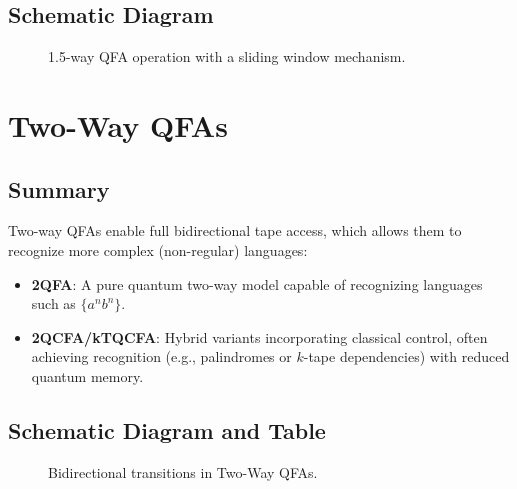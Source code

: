 \subsection{Schematic Diagram}
\begin{figure}[ht]
\centering
{}
\caption{1.5-way QFA operation with a sliding window mechanism.}
\label{fig:1.5qfa}
\end{figure}

\section{Two-Way QFAs}

\subsection{Summary}
Two-way QFAs enable full bidirectional tape access, which allows them to recognize more complex (non-regular) languages:
\begin{itemize}
    \item \textbf{2QFA}: A pure quantum two-way model capable of recognizing languages such as $\{a^nb^n\}$.
    \item \textbf{2QCFA/kTQCFA}: Hybrid variants incorporating classical control, often achieving recognition (e.g., palindromes or $k$-tape dependencies) with reduced quantum memory.
\end{itemize}

\subsection{Schematic Diagram and Table}
\begin{figure}[ht]
\centering
{}
\caption{Bidirectional transitions in Two-Way QFAs.}
\label{fig:two_way}
\end{figure}

